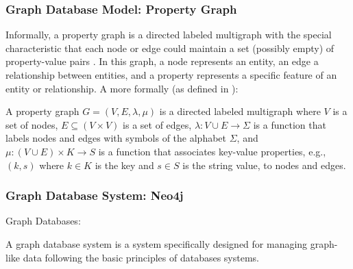 \subsubsection*{Graph Database Model: Property Graph}

Informally, a property graph is a directed labeled multigraph with the special characteristic that each node or edge could maintain a set (possibly empty) of property-value pairs \cite{angles2018propertyGraphDatabaseModel}. In this graph, a node represents an entity, an edge a relationship between entities, and a property represents a specific feature of an entity or relationship. 
A more formally  (as defined in \cite{PG-exampleUsageSimeonovski}):

\begin{definition}
A property graph $G=(V,E, \lambda, \mu)$ is a directed labeled multigraph where $V$ is a set of nodes, $E \subseteq (V \times V)$ is a set of edges, $\lambda: V \cup E \rightarrow \Sigma$ is a function that labels nodes and edges with symbols of the alphabet $\Sigma$, and $\mu: (V \cup E) \times K \rightarrow S$ is a function that associates key-value properties, e.g., $(k,s)$ where $k \in K$ is the key and $s \in S$ is the string value, to nodes and edges.  
\end{definition}




\subsubsection*{Graph Database System: Neo4j}

Graph Databases: \textcolor{blue}{\cite{GDB-angles2008survey, GDB-kumar2015graph}}

A graph database system is a system specifically designed for managing graph-like data following the basic principles of databases systems. 

